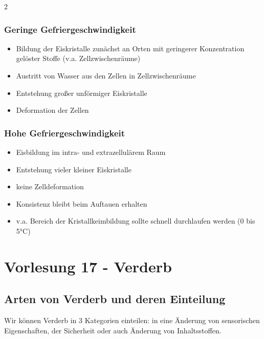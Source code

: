 \documentclass[a4paper,10pt,twoside]{article}
\begin{document}
\ppbig
\begin{multicols}{2}
\subsubsection*{Geringe Gefriergeschwindigkeit}
\begin{itemize}
\item Bildung der Eiskristalle zunächst an Orten mit geringerer Konzentration gelöster Stoffe (v.a. Zellzwischenräume)
\item Austritt von Wasser aus den Zellen in Zellzwischenräume
\item Entstehung großer unförmiger Eiskristalle
\item Deformation der Zellen
\end{itemize}

\columnbreak
\subsubsection*{Hohe Gefriergeschwindigkeit}
\begin{itemize}
\item Eisbildung im intra- und extrazellulärem Raum
\item Entstehung vieler kleiner Eiskristalle
\item keine Zelldeformation
\item Konsistenz bleibt beim Auftauen erhalten
\item v.a. Bereich der Kristallkeimbildung sollte schnell durchlaufen werden (0 bis 5°C)
\end{itemize}
\end{multicols}

\pagebreak

\section*{Vorlesung 17 - Verderb}\addtocounter{section}{1}
\subsection{Arten von Verderb und deren Einteilung}
Wir können Verderb in 3 Kategorien einteilen: in eine Änderung von sensorischen Eigenschaften, der Sicherheit oder auch Änderung von Inhaltsstoffen.
\pp
\end{document}
